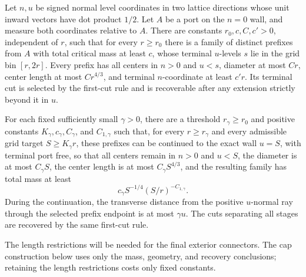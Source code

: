\begin{unnumberedproposition}
\label{L:prop:recoverable-growth}
\label{L:prop:length-controlled-growth}
Let \(n,u\) be signed normal level coordinates in two lattice directions
whose unit inward vectors have dot product \(1/2\). Let \(A\) be a port
on the \(n=0\) wall, and measure both coordinates relative to \(A\).
There are constants \(r_0,c,C,c'>0\), independent of \(r\), such that
for every \(r\ge r_0\) there is a family of distinct prefixes from \(A\)
with total critical mass at least \(c\), whose terminal \(u\)-levels
\(s\) lie in the grid bin \([r,2r]\). Every prefix has all centers in
\(n>0\) and \(u<s\), diameter at most \(Cr\), center length at most
\(Cr^{4/3}\), and terminal \(n\)-coordinate at least \(c'r\).
Its terminal cut is selected by the first-cut rule and is recoverable
after any extension strictly beyond it in \(u\).

For each fixed sufficiently small \(\gamma>0\), there are a threshold
\(r_\gamma\ge r_0\) and positive constants \(K_\gamma,c_\gamma,C_\gamma\),
and \(C_{1,\gamma}\) such that, for every \(r\ge r_\gamma\) and every
admissible grid target \(S\ge K_\gamma r\), these prefixes can be
continued to the exact wall \(u=S\), with terminal port free, so that
all centers remain in \(n>0\) and \(u<S\), the diameter is at most
\(C_\gamma S\), the center length is at most \(C_\gamma S^{4/3}\),
and the resulting family has total mass at least
\[
 c_\gamma S^{-1/4}(S/r)^{-C_{1,\gamma}}.
\]
During the continuation, the transverse distance from the positive
\(u\)-normal ray through the selected prefix endpoint is at most
\(\gamma u\). The cuts separating all stages are recovered by the same
first-cut rule.
\end{unnumberedproposition}

The length restrictions will be needed for the final exterior connectors.
The cap construction below uses only the mass, geometry, and recovery
conclusions; retaining the length restrictions costs only fixed constants.

